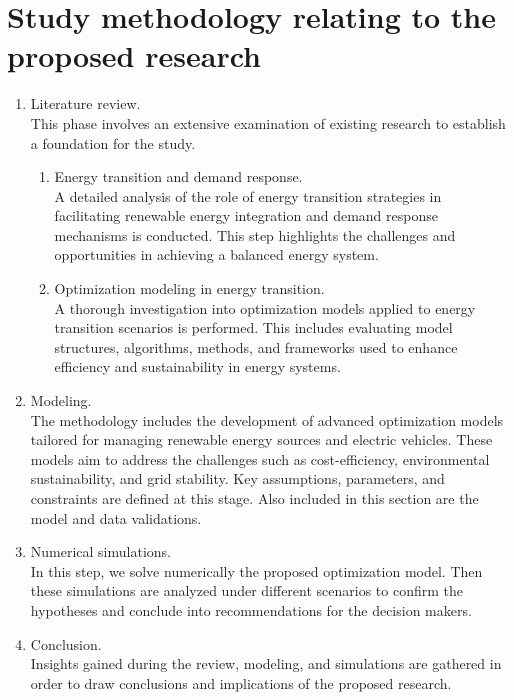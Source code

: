 \documentclass[12pt]{report}
\begin{document}
\section{Study methodology relating to the proposed research}
\begin{enumerate}[label=\arabic*.]
  \item Literature review.\\
    This phase involves an extensive examination of existing research to establish a foundation for the study.    
    \begin{enumerate}[label=\alph*., leftmargin=*]
      \item Energy transition and demand response.\\
        A detailed analysis of the role of energy transition strategies in facilitating renewable energy integration and demand response mechanisms is conducted. 
        This step highlights the challenges and opportunities in achieving a balanced energy system.
      \item Optimization modeling in energy transition.\\
        A thorough investigation into optimization models applied to energy transition scenarios is performed. 
        This includes evaluating model structures, algorithms, methods, and frameworks used to enhance efficiency and sustainability in energy systems.
    \end{enumerate}
  \item Modeling.\\
    The methodology includes the development of advanced optimization models tailored for managing renewable energy sources and electric vehicles. 
    These models aim to address the challenges such as cost-efficiency, environmental sustainability, and grid stability. 
    Key assumptions, parameters, and constraints are defined at this stage.
    Also included in this section are the model and data validations.
  \item Numerical simulations.\\
    In this step, we solve numerically the proposed optimization model.
    Then these simulations are analyzed under different scenarios to confirm the hypotheses and conclude into recommendations for the decision makers. 
  \item Conclusion.\\
    Insights gained during the review, modeling, and simulations are gathered in order to draw conclusions and implications of the proposed research.
\end{enumerate}
\end{document}

